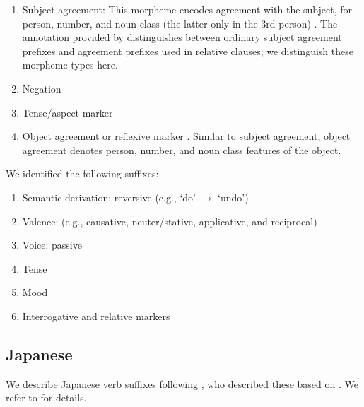 \documentclass[11pt,letterpaper]{article}
\begin{document}
\begin{enumerate}
    \item Subject agreement: This morpheme encodes agreement with the subject, for person, number, and noun class (the latter only in the 3rd person) \cite[]{doke1967textbook}.
            The annotation provided by \cite{demuth1992acquisition} distinguishes between ordinary subject agreement prefixes and agreement prefixes used in relative clauses; we distinguish these morpheme types here.

    \item Negation \citep[]{doke1967textbook}

    \item Tense/aspect marker   \citep[--424]{doke1967textbook}

    \item Object agreement or reflexive marker \citep[]{doke1967textbook}.
    Similar to subject agreement, object agreement denotes person, number, and noun class features of the object.
\end{enumerate}
We identified the following suffixes:

\begin{enumerate}
\item Semantic derivation: reversive (e.g., `do' $\rightarrow$ `undo')
\item Valence: (e.g., causative, neuter/stative, applicative, and reciprocal)
    \item Voice: passive
    \item Tense
    \item Mood
    \item Interrogative and relative markers
\end{enumerate}

\subsection{Japanese}

We describe Japanese verb suffixes following \citep{Hahn2020modeling}, who described these based on \citep{kaiser2013japanese,hasegawa2014japanese}.
We refer to \citep{Hahn2020modeling} for details.
\end{document}
